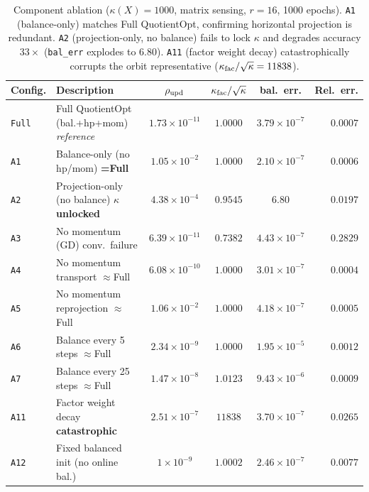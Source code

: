 \begin{table}[t]
\centering
\caption{Component ablation ($\kappa(X)=1000$, matrix sensing, $r=16$, 1000 epochs).
  \texttt{A1} (balance-only) matches Full QuotientOpt, confirming horizontal projection is redundant.
  \texttt{A2} (projection-only, no balance) fails to lock $\kappa$ and degrades accuracy $33\times$
  (\texttt{bal\_err} explodes to $6.80$). \texttt{A11} (factor weight decay) catastrophically
  corrupts the orbit representative ($\kappa_{\rm fac}/\sqrt{\kappa}=11838$).}
\label{tab:ablation}
\vspace{4pt}
\begin{tabular}{llcccr}
\toprule
\textbf{Config.} & \textbf{Description} & $\rho_{\rm upd}$ & $\kappa_{\rm fac}/\sqrt{\kappa}$ & bal.\ err. & Rel.\ err. \\
\midrule
\rowcolor{oursbg}\texttt{Full} & Full QuotientOpt (bal.+hp+mom) \hfill\textit{reference} & $1.73\times 10^{-11}$ & $1.0000$ & $3.79\times 10^{-7}$ & $0.0007$ \\
\texttt{A1} & Balance-only (no hp/mom) \hfill\textbf{=Full} & $1.05\times 10^{-2}$ & $1.0000$ & $2.10\times 10^{-7}$ & $0.0006$ \\
\midrule
\texttt{A2} & Projection-only (no balance) \hfill\textbf{\boldmath $\kappa$ unlocked} & $4.38\times 10^{-4}$ & $0.9545$ & $6.80$ & $0.0197$ \\
\texttt{A3} & No momentum (GD) \hfill conv.\ failure & $6.39\times 10^{-11}$ & $0.7382$ & $4.43\times 10^{-7}$ & $0.2829$ \\
\texttt{A4} & No momentum transport \hfill $\approx$Full & $6.08\times 10^{-10}$ & $1.0000$ & $3.01\times 10^{-7}$ & $0.0004$ \\
\texttt{A5} & No momentum reprojection \hfill $\approx$Full & $1.06\times 10^{-2}$ & $1.0000$ & $4.18\times 10^{-7}$ & $0.0005$ \\
\texttt{A6} & Balance every 5 steps \hfill $\approx$Full & $2.34\times 10^{-9}$ & $1.0000$ & $1.95\times 10^{-5}$ & $0.0012$ \\
\texttt{A7} & Balance every 25 steps \hfill $\approx$Full & $1.47\times 10^{-8}$ & $1.0123$ & $9.43\times 10^{-6}$ & $0.0009$ \\
\midrule
\texttt{A11} & Factor weight decay \hfill\textbf{catastrophic} & $2.51\times 10^{-7}$ & $11838$ & $3.70\times 10^{-7}$ & $0.0265$ \\
\texttt{A12} & Fixed balanced init (no online bal.) & $1\times 10^{-9}$ & $1.0002$ & $2.46\times 10^{-7}$ & $0.0077$ \\
\bottomrule
\end{tabular}
\end{table}
